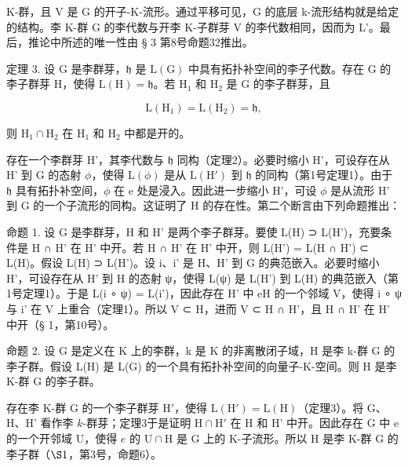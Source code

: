 K-群，且 V 是 G 的开子-K-流形。通过平移可见，G 的底层 k-流形结构就是给定的结构。李 K-群 G 的李代数与开李 K-子群芽 V 的李代数相同，因而为 L'。最后，推论中所述的唯一性由 § 3 第8号命题32推出。

定理 3. 设 G 是李群芽，\(\mathfrak{h}\) 是 \(\mathrm{L}(\mathrm{G})\) 中具有拓扑补空间的李子代数。存在 G 的李子群芽 H，使得 \(\mathrm{L}(\mathrm{H}) = \mathfrak{h}\)。若 \(\mathrm{H}_1\) 和 \(\mathrm{H}_2\) 是 G 的李子群芽，且

\[
\mathrm{L} (\mathrm{H} _ {1}) = \mathrm{L} (\mathrm{H} _ {2}) = \mathfrak {h},
\]

则 \(\mathrm{H}_1\cap \mathrm{H}_2\) 在 \(\mathrm{H}_1\) 和 \(\mathrm{H}_2\) 中都是开的。

存在一个李群芽 H'，其李代数与 \(\mathfrak{h}\) 同构（定理2）。必要时缩小 H'，可设存在从 H' 到 G 的态射 \(\phi\)，使得 \(\mathrm{L}(\phi)\) 是从 \(\mathrm{L}(\mathrm{H}')\) 到 \(\mathfrak{h}\) 的同构（第1号定理1）。由于 \(\mathfrak{h}\) 具有拓扑补空间，\(\phi\) 在 e 处是浸入。因此进一步缩小 H'，可设 \(\phi\) 是从流形 H' 到 G 的一个子流形的同构。这证明了 H 的存在性。第二个断言由下列命题推出：

命题 1. 设 G 是李群芽，H 和 H' 是两个李子群芽。要使 L(H) ⊃ L(H')，充要条件是 H ∩ H' 在 H' 中开。若 H ∩ H' 在 H' 中开，则 L(H') = L(H ∩ H') ⊂ L(H)。假设 L(H) ⊃ L(H')。设 i、i' 是 H、H' 到 G 的典范嵌入。必要时缩小 H'，可设存在从 H' 到 H 的态射 ψ，使得 L(ψ) 是 L(H') 到 L(H) 的典范嵌入（第1号定理1）。于是 L(i ∘ ψ) = L(i')，因此存在 H' 中 eH 的一个邻域 V，使得 i ∘ ψ 与 i' 在 V 上重合（定理1）。所以 V ⊂ H，进而 V ⊂ H ∩ H'，且 H ∩ H' 在 H' 中开（§ 1，第10号）。

命题 2. 设 G 是定义在 K 上的李群，k 是 K 的非离散闭子域，H 是李 k-群 G 的李子群。假设 L(H) 是 L(G) 的一个具有拓扑补空间的向量子-K-空间。则 H 是李 K-群 G 的李子群。

存在李 K-群 G 的一个李子群芽 \(\mathrm{H}'\)，使得 \(\mathrm{L}(\mathrm{H}') = \mathrm{L}(\mathrm{H})\)（定理3）。将 G、H、H' 看作李 \(k\)-群芽；定理3于是证明 \(\mathrm{H} \cap \mathrm{H}'\) 在 H 和 H' 中开。因此存在 G 中 e 的一个开邻域 U，使得 \(e\) 的 \(\mathrm{U} \cap \mathrm{H}\) 是 G 上的 K-子流形。所以 H 是李 K-群 G 的李子群（\(\S 1\)，第3号，命题6）。

